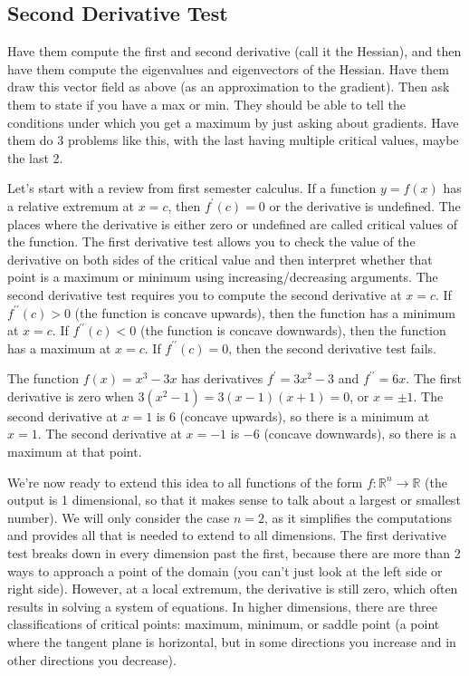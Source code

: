 \subsection{Second Derivative Test}

Have them compute the first and second derivative (call it the Hessian), and then have them compute the eigenvalues and eigenvectors of the Hessian.  Have them draw this vector field  as above (as an approximation to the gradient).  Then ask them to state if you have a max or min.  They should be able to tell the conditions under which you get a maximum by just asking about gradients.  Have them do 3 problems like this, with the last having multiple critical values, maybe the last 2. 

Let's start with a review from first semester calculus. If a function $y=f(x)$ has a relative extremum at $x=c$, then $f^\prime(c)=0$ or the derivative is undefined. The places where the derivative is either zero or undefined are called critical values of the function. The first derivative test allows you to check the value of the derivative on both sides of the critical value and then interpret whether that point is a maximum or minimum using increasing/decreasing arguments.  The second derivative test requires you to compute the second derivative at $x=c$. If $f^{\prime\prime}(c)>0$ (the function is concave upwards), then the function has a minimum at $x=c$. If $f^{\prime\prime}(c)<0$ (the function is concave downwards), then the function has a maximum at $x=c$. If $f^{\prime\prime}(c)=0$, then the second derivative test fails. 

\begin{example}
The function $f(x) = x^3-3x$ has derivatives $f^\prime = 3x^2-3$ and $f^{\prime\prime}=6x$.  The first derivative is zero when $3(x^2-1)=3(x-1)(x+1)=0$, or $x=\pm 1$.  The second derivative at $x=1$ is $6$ (concave upwards), so there is a minimum at $x=1$.  The second derivative at $x=-1$ is $-6$ (concave downwards), so there is a maximum at that point. 
\end{example}

We're now ready to extend this idea to all functions of the form $f:{\mathbb{R}}^n\to{\mathbb{R}}$ (the output is 1 dimensional, so that it makes sense to talk about a largest or smallest number). We will only consider the case $n=2$, as it simplifies the computations and provides all that is needed to extend to all dimensions. The first derivative test breaks down in every dimension past the first, because there are more than 2 ways to approach a point of the domain (you can't just look at the left side or right side). However, at a local extremum, the derivative is still zero, which often results in solving a system of equations. In higher dimensions, there are three classifications of critical points: maximum, minimum, or saddle point (a point where the tangent plane is horizontal, but in some directions you increase and in other directions you decrease). 

